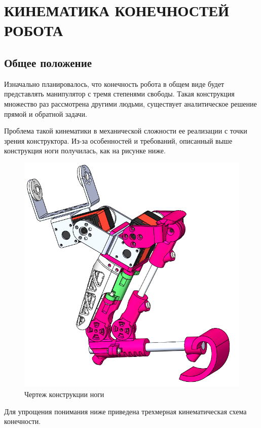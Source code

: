 \chapter{\MakeUppercase{Кинематика конечностей робота}}
\section{Общее положение}
Изначально планировалось, что конечность робота в общем виде будет представлять манипулятор с тремя степенями свободы. Такая конструкция множество раз рассмотрена другими людьми, существует аналитическое решение прямой и обратной задачи.

Проблема такой кинематики в механической сложности ее реализации с точки зрения конструктора. Из-за особенностей и требований, описанный выше \fixme конструкция ноги получилась, как на рисунке ниже.

\begin{figure}[h]
    \centering
    \includegraphics[scale=0.5]{chapter_kinematics/figure2.png}
    \caption{Чертеж конструкции ноги}
    \label{}
\end{figure}

Для упрощения понимания ниже приведена трехмерная кинематическая схема конечности.

